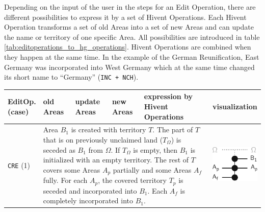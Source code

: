 Depending on the input of the user in the steps for an Edit Operation, there are different possibilities to express it by a set of Hivent Operations. Each Hivent Operation transforms a set of old Areas into a set of new Areas and can update the name or territory of one specific Area. All possibilities are introduced in table \ref{tab:editoperations_to_hg_operations}. Hivent Operations are combined when they happen at the same time. In the example of the German Reunification, East Germany was incorporated into West Germany which at the same time changed its short name to ``Germany'' (\texttt{INC + NCH}).

\begin{center}
\begin{longtable}{m{1.2cm} m{0.95cm} m{0.95cm} m{0.95cm} m{6.0cm} m{2.3cm}}
  \toprule

  \pbox{1.2cm}{EditOp.\\(case)} &
  \pbox{0.95cm}{old\\Areas\\[-0.8em]} &
  \pbox{0.95cm}{update\\Areas\\[-0.8em]} &
  \pbox{0.95cm}{new\\Areas\\[-0.8em]} &
  expression by Hivent Operations \protect\footnotemark &
  visualization \\
  \midrule
  \endhead



  \multirow{9}{*}{\texttt{CRE} (1)} &
  \multicolumn{4}{p{10cm}}{
    Area $B_1$ is created with territory $T$. The part of $T$ that is on previously unclaimed land ($T_\Omega$) is seceded as $B_1$ from $\Omega$.
    If $T_\Omega$ is empty, then $B_1$ is initialized with an empty territory.
    The rest of $T$ covers some Areas $A_p$ partially and some Areas $A_f$ fully.
    For each $A_p$, the covered territory $T_p$ is seceded and incorporated into $B_1$.
    Each $A_f$ is completely incorporated into $B_1$.
  } &
  \multirow{9}{*}{
    \includegraphics[width=2.5cm]{graphics/development/edit_to_hivent_operations/CRE_to_SEC+UNI}
  } \\


\end{longtable}
\end{center}
